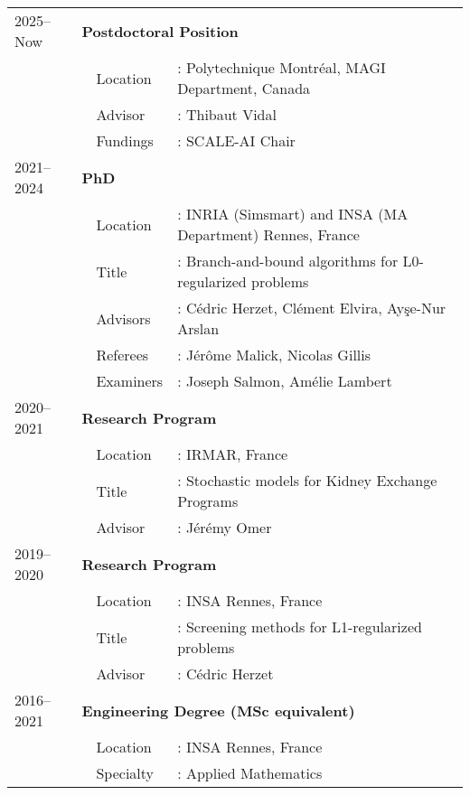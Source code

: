 \begin{longtable}[l]{@{}p{}p{}p{}p{}}
    2025--Now & \multicolumn{3}{l}{\textbf{Postdoctoral Position}} \\
    & & Location &: Polytechnique Montréal, MAGI Department, Canada \\
    & & Advisor &: Thibaut Vidal \\
    & & Fundings &: SCALE-AI Chair \\
    2021--2024 & \multicolumn{3}{l}{\textbf{PhD}} \\
    & & Location &: INRIA (Simsmart) and INSA (MA Department) Rennes, France \\
    & & Title &: Branch-and-bound algorithms for L0-regularized problems \\
    & & Advisors &: Cédric Herzet, Clément Elvira, Ay\c{s}e-Nur Arslan \\
    & & Referees &:  Jérôme Malick, Nicolas Gillis \\
    & & Examiners &: Joseph Salmon, Amélie Lambert \\
    2020--2021 & \multicolumn{3}{l}{\textbf{Research Program}} \\
    & & Location &: IRMAR, France \\
    & & Title &: Stochastic models for Kidney Exchange Programs \\
    & & Advisor &: Jérémy Omer \\
    2019--2020 & \multicolumn{3}{l}{\textbf{Research 
    Program}} \\
    & & Location &: INSA Rennes, France \\
    & & Title &: Screening methods for L1-regularized problems \\
    & & Advisor &: Cédric Herzet \\
    2016--2021 & \multicolumn{3}{l}{\textbf{Engineering Degree (MSc equivalent)}} \\
    & & Location &: INSA Rennes, France \\
    & & Specialty &: Applied Mathematics 
\end{longtable}
